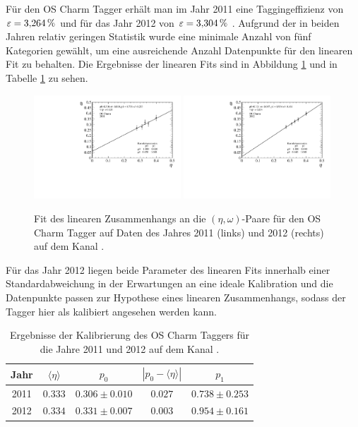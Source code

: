 Für den OS Charm Tagger erhält man im Jahr \num{2011} eine Taggingeffizienz von $\varepsilon=\SI{3{,}264}{\%}$ und für das Jahr \num{2012} von $\varepsilon=\SI{3{,}304}{\%}$ . Aufgrund der in beiden Jahren relativ geringen Statistik wurde eine minimale Anzahl von fünf Kategorien gewählt, um eine ausreichende Anzahl Datenpunkte für den linearen Fit zu behalten. Die Ergebnisse der linearen Fits sind in Abbildung \ref{fig:fit_OSCharm} und in Tabelle \ref{tab:result_OSCharm} zu sehen.
\begin{figure}[htbp]
	\centering
		\includegraphics[width=0.49\textwidth]{fig/2011_OSCharm.pdf}
		\includegraphics[width=0.49\textwidth]{fig/2012_OSCharm.pdf}
	\caption{Fit des linearen Zusammenhangs an die $(\eta,\omega)$-Paare für den OS Charm Tagger auf Daten des Jahres \num{2011} (links) und \num{2012} (rechts) auf dem Kanal \BdToDpi.}
	\label{fig:fit_OSCharm} 
\end{figure} 
Für das Jahr \num{2012} liegen beide Parameter des linearen Fits innerhalb einer Standardabweichung in der Erwartungen an eine ideale Kalibration und die Datenpunkte passen zur Hypothese eines linearen Zusammenhangs, sodass der Tagger hier als kalibiert angesehen werden kann. 
\begin{table}[htbp]
	\centering
	\caption{Ergebnisse der Kalibrierung des OS Charm Taggers für die Jahre \num{2011} und \num{2012} auf dem Kanal \BdToDpi.}
	\label{tab:result_OSCharm}
	\begin{tabular}{ccccc}
	\toprule
       Jahr & $\langle\eta\rangle$ & $p_0$ & $\left|p_0-\langle\eta\rangle\right|$ & $p_1$ \\ 
       \midrule
       2011 & $0{.}333$ & $0{.}306\pm0{.}010$ & $0{.}027$ & $0{.}738\pm0{.}253$ \\
      2012 & $0{.}334$ & $0{.}331\pm0{.}007$ & $0{.}003$ & $0{.}954\pm0{.}161$ \\ 
      \bottomrule
	\end{tabular}
\end{table}
